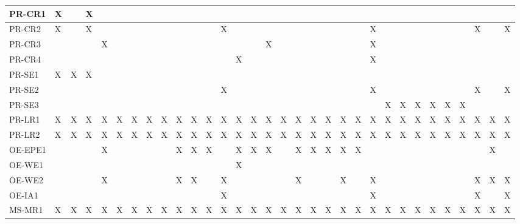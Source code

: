 \documentclass[12pt]{article}
\begin{document}
\begin{table}[!ht]
{\begin{tabular}{|l|l|l|l|l|l|l|l|l|l|l|l|l|l|l|l|l|l|l|l|l|l|l|l|l|l|l|l|l|l|l|l|}
      PR-CR1 & X & ~ & X & ~ & ~ & ~ & ~ & ~ & ~ & ~ & ~ & ~ & ~ & ~ & ~ & ~ & ~ & ~ & ~ & ~ & ~ & ~ & ~ & ~ & ~ & ~ & ~ & ~ & ~ & ~ & ~ \\ \hline
      PR-CR2 & X & ~ & X & ~ & ~ & ~ & ~ & ~ & ~ & ~ & ~ & X & ~ & ~ & ~ & ~ & ~ & ~ & ~ & ~ & ~ & X & ~ & ~ & ~ & ~ & ~ & ~ & X & ~ & X \\ \hline
      PR-CR3 & ~ & ~ & ~ & X & ~ & ~ & ~ & ~ & ~ & ~ & ~ & ~ & ~ & ~ & X & ~ & ~ & ~ & ~ & ~ & ~ & X & ~ & ~ & ~ & ~ & ~ & ~ & ~ & ~ & ~ \\ \hline
      PR-CR4 & ~ & ~ & ~ & ~ & ~ & ~ & ~ & ~ & ~ & ~ & ~ & ~ & X & ~ & ~ & ~ & ~ & ~ & ~ & ~ & ~ & X & ~ & ~ & ~ & ~ & ~ & ~ & ~ & ~ & ~ \\ \hline
      PR-SE1 & X & X & X & ~ & ~ & ~ & ~ & ~ & ~ & ~ & ~ & ~ & ~ & ~ & ~ & ~ & ~ & ~ & ~ & ~ & ~ & ~ & ~ & ~ & ~ & ~ & ~ & ~ & ~ & ~ & ~ \\ \hline
      PR-SE2 & ~ & ~ & ~ & ~ & ~ & ~ & ~ & ~ & ~ & ~ & ~ & X & ~ & ~ & ~ & ~ & ~ & ~ & ~ & ~ & ~ & X & ~ & ~ & ~ & ~ & ~ & ~ & X & ~ & X \\ \hline
      PR-SE3 & ~ & ~ & ~ & ~ & ~ & ~ & ~ & ~ & ~ & ~ & ~ & ~ & ~ & ~ & ~ & ~ & ~ & ~ & ~ & ~ & ~ & ~ & X & X & X & X & X & X & ~ & ~ & ~ \\ \hline
      PR-LR1 & X & X & X & X & X & X & X & X & X & X & X & X & X & X & X & X & X & X & X & X & X & X & X & X & X & X & X & X & X & X & X \\ \hline
      PR-LR2 & X & X & X & X & X & X & X & X & X & X & X & X & X & X & X & X & X & X & X & X & X & X & X & X & X & X & X & X & X & X & X \\ \hline
      OE-EPE1 & ~ & ~ & ~ & X & ~ & ~ & ~ & ~ & X & X & X & ~ & X & X & X & ~ & X & X & X & X & X & ~ & ~ & ~ & ~ & ~ & ~ & ~ & ~ & X & ~ \\ \hline
      OE-WE1 & ~ & ~ & ~ & ~ & ~ & ~ & ~ & ~ & ~ & ~ & ~ & ~ & X & ~ & ~ & ~ & ~ & ~ & ~ & ~ & ~ & ~ & ~ & ~ & ~ & ~ & ~ & ~ & ~ & ~ & ~ \\ \hline
      OE-WE2 & ~ & ~ & ~ & X & ~ & ~ & ~ & ~ & X & X & ~ & X & ~ & ~ & ~ & ~ & X & ~ & ~ & X & ~ & X & ~ & ~ & ~ & ~ & ~ & ~ & X & X & X \\ \hline
      OE-IA1 & ~ & ~ & ~ & ~ & ~ & ~ & ~ & ~ & ~ & ~ & ~ & X & ~ & ~ & ~ & ~ & ~ & ~ & ~ & ~ & ~ & X & ~ & ~ & ~ & ~ & ~ & ~ & X & ~ & X \\ \hline
      MS-MR1 & X & X & X & X & X & X & X & X & X & X & X & X & X & X & X & X & X & X & X & X & X & X & X & X & X & X & X & X & X & X & X \\ \hline

\end{tabular}}
\end{table}
\end{document}
